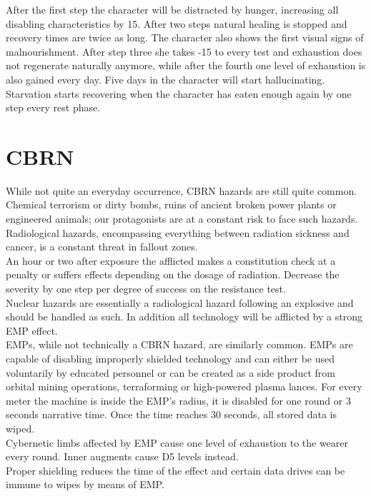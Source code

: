 \documentclass[12pt,a4paper]{book}
\begin{document}
	After the first step the character will be distracted by hunger, increasing all disabling characteristics by 15. After two steps natural healing is stopped and recovery times are twice as long. The character also shows the first visual signs of malnourishment. After step three she takes -15 to every test and exhaustion does not regenerate naturally anymore, while after the fourth one level of exhaustion is also gained every day. Five days in the character will start hallucinating.\\
	Starvation starts recovering when the character has eaten enough again by one step every rest phase.
	\section{CBRN}
	While not quite an everyday occurrence, CBRN hazards are still quite common. Chemical terrorism or dirty bombs, ruins of ancient broken power plants or engineered animals; our protagonists are at a constant risk to face such hazards.\\
	Radiological hazards, encompassing everything between radiation sickness and cancer, is a constant threat in fallout zones.\\
	An hour or two after exposure the afflicted makes a constitution check at a penalty or suffers effects depending on the dosage of radiation. Decrease the severity by one step per degree of success on the resistance test.\\
	Nuclear hazards are essentially a radiological hazard following an explosive and should be handled as such. In addition all technology will be afflicted by a strong EMP effect.\\
	EMPs, while not technically a CBRN hazard, are similarly common. EMPs are capable of disabling improperly shielded technology and can either be used voluntarily by educated personnel or can be created as a side product from orbital mining operations, terraforming or high-powered plasma lances. For every meter the machine is inside the EMP’s radius, it is disabled for one round or 3 seconds narrative time. Once the time reaches 30 seconds, all stored data is wiped.\\
	Cybernetic limbs affected by EMP cause one level of exhaustion to the wearer every round. Inner augments cause D5 levels instead.\\
	Proper shielding reduces the time of the effect and certain data drives can be immune to wipes by means of EMP.
\end{document}
